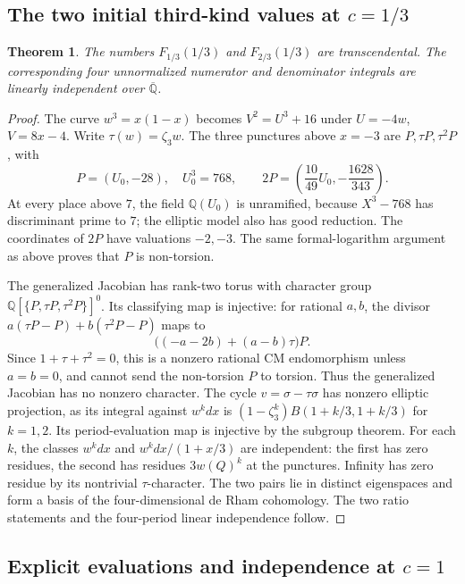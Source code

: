 \documentclass[11pt,a4paper]{article}
\newtheorem{theorem}{Theorem}[section]
\theoremstyle{definition}
\theoremstyle{remark}
\numberwithin{equation}{section}
\begin{document}
\subsection{The two initial third-kind values at $c=1/3$}

\begin{theorem}\label{log1-initial-thirds}
The numbers $F_{1/3}(1/3)$ and $F_{2/3}(1/3)$ are transcendental.
The corresponding four unnormalized numerator and denominator
integrals are linearly independent over $\overline{\mathbb Q}$.
\end{theorem}
\begin{proof}
The curve $w^3=x(1-x)$ becomes $V^2=U^3+16$ under
$U=-4w$, $V=8x-4$. Write $\tau(w)=\zeta_3w$. The three punctures
above $x=-3$ are $P,\tau P,\tau^2P$, with
\[
 P=(U_0,-28),\quad U_0^3=768,\qquad
 2P=\left(\frac{10}{49}U_0,-\frac{1628}{343}\right).
\]
At every place above $7$, the field $\mathbb Q(U_0)$ is unramified,
because $X^3-768$ has discriminant prime to $7$; the elliptic model
also has good reduction. The coordinates of $2P$ have valuations
$-2,-3$. The same formal-logarithm argument as above proves that $P$
is non-torsion.

The generalized Jacobian has rank-two torus with character group
$\mathbb Q[\{P,\tau P,\tau^2P\}]^0$. Its classifying map is injective:
for rational $a,b$, the divisor
$a(\tau P-P)+b(\tau^2P-P)$ maps to
\[
 \bigl((-a-2b)+(a-b)\tau\bigr)P.
\]
Since $1+\tau+\tau^2=0$, this is a nonzero rational CM endomorphism
unless $a=b=0$, and cannot send the non-torsion $P$ to torsion.
Thus the generalized Jacobian has no nonzero character. The cycle
$v=\sigma-\tau\sigma$ has nonzero elliptic projection, as its integral
against $w^kdx$ is $(1-\zeta_3^k)B(1+k/3,1+k/3)$ for $k=1,2$.
Its period-evaluation map is injective by the subgroup theorem.
For each $k$, the classes $w^kdx$ and $w^kdx/(1+x/3)$ are independent:
the first has zero residues, the second has residues $3w(Q)^k$ at the
punctures. Infinity has zero residue by its nontrivial $\tau$-character.
The two pairs lie in distinct eigenspaces and form a basis of the
four-dimensional de Rham cohomology. The two ratio statements and the
four-period linear independence follow.
\end{proof}

\subsection{Explicit evaluations and independence at $c=1$}
\end{document}
